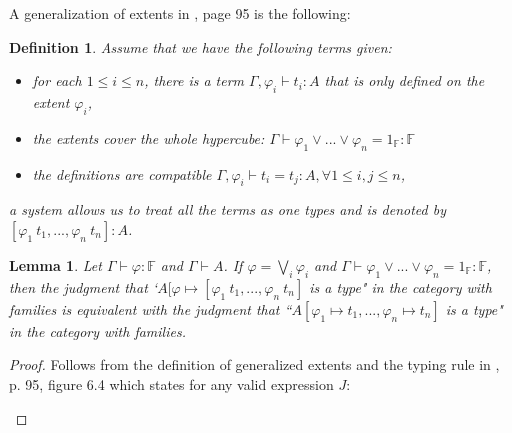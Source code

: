 \documentclass[12pt,a4paper,twoside,xetex]{book}
\newcommand{\keyword}[1]{\emph{#1}\index{#1}}
\newtheorem{lemma}[theorem]{Lemma}
\newtheorem{definition}[theorem]{Definition}
\begin{document}
A generalization of extents in \cite{Huber2016}, page 95 is the following:

\begin{prooftree}
\end{prooftree}

\begin{definition}Assume that we have the following terms given: 

\begin{itemize}
\item for each $1 \leq i \leq n$, there is a term  $\Gamma, \varphi_i \vdash t_i : A$ that is only defined on the extent $\varphi_i$, 
\item the extents cover the whole hypercube: $\Gamma \vdash \varphi_1 \vee ... \vee \varphi_n = 1_{\mathbb{F}} : \mathbb{F}$ 
\item the definitions are compatible $\Gamma, \varphi_i \vdash t_i = t_j : A, \forall 1\leq i,j\leq n$, 
\end{itemize}
a \keyword{system} allows us to treat all the terms as one types and is denoted by $[\varphi_1 \  t_1, ..., \varphi_n \ t_n]: A$.
\end{definition}

\begin{lemma}\label{extentrewrite}
Let $\Gamma \vdash \varphi : \mathbb{F}$ and $\Gamma \vdash A$. If $\varphi = \bigvee_i \varphi_i$ and $\Gamma \vdash \varphi_1 \vee ... \vee \varphi_n = 1_{\mathbb{F}} : \mathbb{F}$, then the judgment that `$A [\varphi \mapsto  [\varphi_1 \ t_1, ..., \varphi_n \ t_n]$ is a type" in the category with families is equivalent with the judgment that ``$A [\varphi_1 \mapsto t_1, ..., \varphi_n \mapsto t_n]$ is a type" in the category with families.

\end{lemma}

\begin{proof}
Follows from the definition of generalized extents and the typing rule in \cite{Huber2016}, p. 95, figure 6.4 which states for any valid expression $J$: 

\begin{prooftree}
\end{prooftree}

\end{proof}
\end{document}
